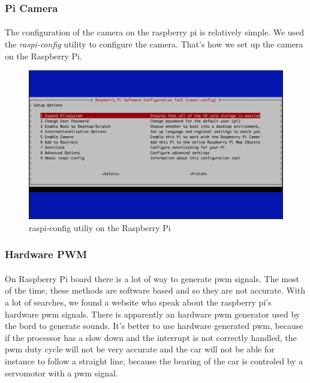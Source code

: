 \subsubsection{Pi Camera}
\paragraph{}
The configuration of the camera on the raspberry pi is relatively simple. We
used the \textit{raspi-config} utility to configure the camera. That's how we set up
the camera on the Raspberry Pi.

\begin{figure}[!ht]
    \begin{center}
        \includegraphics[scale=0.3]{Images/Raspi_config.png}
    \end{center}
    \caption{raspi-config utiliy on the Raspberry Pi}
    \label{fig:raspi_config}
\end{figure}

\subsubsection{Hardware PWM}
\paragraph{}
On Raspberry Pi board there is a lot of way to generate pwm signals.
The most of the time, these methods are software based and so they are not
accurate. With a lot of searches, we found a website who speak about the
raspberry pi's hardware pwm signals. There is apparently an hardware pwm
generator used by the bord to generate sounds. It's better to use hardware 
generated pwm, because if the processor has a slow down and the interrupt
is not correctly handled, the pwm duty cycle will not be very accurate and
the car will not be able for instance to follow a straight line, because the
bearing of the car is controled by a servomotor with a pwm signal.

